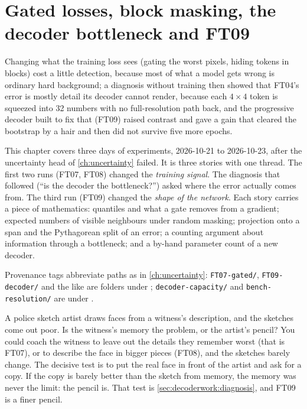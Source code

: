 \chapter{Gated losses, block masking, the decoder bottleneck and FT09}\label{ch:decoderwork}

\begin{onething}
Changing what the training loss sees (gating the worst pixels, hiding tokens in blocks) cost a little
detection, because most of what a model gets wrong is ordinary hard background; a diagnosis without training
then showed that FT04's error is mostly detail its decoder cannot render, because each $4\times4$ token is
squeezed into 32 numbers with no full-resolution path back, and the progressive decoder built to fix that
(FT09) raised contrast and gave a gain that cleared the bootstrap by a hair and then did not survive five more
epochs.
\end{onething}

This chapter covers three days of experiments, 2026-10-21 to 2026-10-23, after the uncertainty head of
\cref{ch:uncertainty} failed. It is three stories with one thread. The first two runs (FT07, FT08) changed the
\emph{training signal}. The diagnosis that followed (``is the decoder the bottleneck?'') asked where the error
actually comes from. The third run (FT09) changed the \emph{shape of the network}. Each story carries a piece
of mathematics: quantiles and what a gate removes from a gradient; expected numbers of visible neighbours under
random masking; projection onto a span and the Pythagorean split of an error; a counting argument about
information through a bottleneck; and a by-hand parameter count of a new decoder.

Provenance tags abbreviate paths as in \cref{ch:uncertainty}: \texttt{FT07-gated/}, \texttt{FT09-decoder/} and
the like are folders under ; \texttt{decoder-capacity/} and
\texttt{bench-resolution/} are under .

\begin{analogy}
A police sketch artist draws faces from a witness's description, and the sketches come out poor. Is the
witness's memory the problem, or the artist's pencil? You could coach the witness to leave out the details
they remember worst (that is FT07), or to describe the face in bigger pieces (FT08), and the sketches barely
change. The decisive test is to put the real face in front of the artist and ask for a copy. If the copy is
barely better than the sketch from memory, the memory was never the limit: the pencil is. That test is
\cref{sec:decoderwork:diagnosis}, and FT09 is a finer pencil.
\end{analogy}


